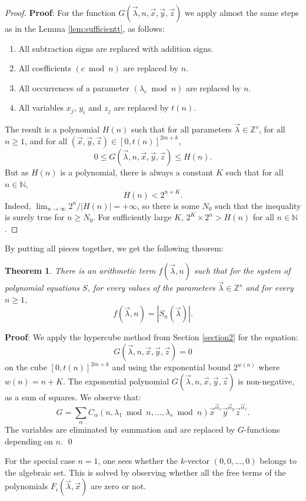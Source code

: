 \documentclass[10pt,a4paper]{article}
\theoremstyle{plain}
\newtheorem{theorem}{Theorem}[section]
\begin{document}
\begin{proof}
{\bf Proof}: For the function $G(\vec \lambda, n, \vec x, \vec y, \vec z)$ we apply almost the same steps as in the Lemma \ref{lem:sufficientt}, as follows: 
\begin{enumerate}
    \item All subtraction signs are replaced with addition signs.
    \item All coefficients $(c \bmod n)$ are replaced by $n$.
    \item All occurrences of a parameter $(\lambda_{e} \bmod n) $ are replaced by $n$.
    \item All variables $x_j$, $y_i$ and $z_j$ are replaced by $t(n)$. 
\end{enumerate} 
The result is a polynomial $H(n)$ such that for all parameters $\vec \lambda \in \mathbb Z^s$, for all $n \geq 1$, and for all $(\vec x, \vec y, \vec z) \in [0, t(n)]^{2m+k}$, 
$$0 \leq G(\vec \lambda,n, \vec x, \vec y, \vec z) \leq H(n). $$
But as $H(n)$ is a polynomial, there is always a constant $K$ such that for all $n \in \mathbb N$, 
$$H(n) < 2^{n+K}.$$
Indeed, $\lim_{n \rightarrow \infty} 2^n / |H(n)| = + \infty$, so there is some $N_0$ such that the inequality is surely true for $n \geq N_0$. For sufficiently large $K$, $2^K \times 2^n > H(n)$ for all $n \in \mathbb N$. 
\end{proof}


By putting all pieces together, we get the following theorem:

\begin{theorem}\label{main} There is an arithmetic term $f(\vec \lambda, n)$ such that
    for the system of polynomial equations $S$, for every values of the parameters $\vec \lambda \in \mathbb Z^s$ and for every $n \geq 1$, 
    $$f(\vec \lambda, n) = |S_n(\vec \lambda)|. $$
\end{theorem} 

{\bf Proof}: We apply the hypercube method from Section \ref{section2} for the equation:
$$G(\vec \lambda, n, \vec x, \vec y, \vec z) = 0$$
on the cube $[0, t(n)]^{2m+k}$ and using the exponential bound $2^{w(n)}$ where $w(n) = n+K$. The exponential polynomial $G(\vec \lambda, n, \vec x, \vec y, \vec z)$ is non-negative, as a sum of squares. We observe that:
$$G = \sum _\alpha C_\alpha(n, \lambda_1 \bmod n, \dots, \lambda_s \bmod n){\vec x}^{\vec \alpha_x}{\vec y}^{\vec \alpha_y}{\vec z}^{\vec \alpha_z}.$$
The variables are eliminated by summation and are replaced by $G$-functions depending on $n$.  \qed 

For the special case $n=1$, one sees whether the $k$-vector $(0,0,\dots, 0)$ belongs to the algebraic set. This is solved by observing whether all the free terms of the polynomials $F_i(\vec \lambda, \vec x)$ are zero or not. 
\end{document}
